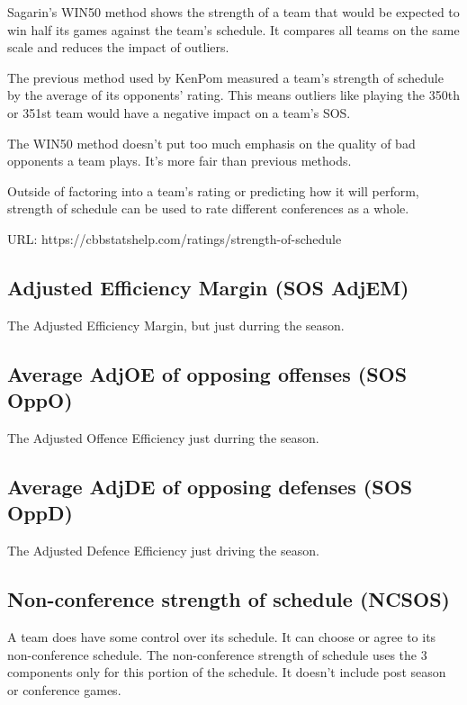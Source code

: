 \documentclass[
10pt, %
a4paper, %
oneside, %
headinclude,footinclude, %
BCOR5mm, %
]{scrartcl}
\begin{document}
\begin{description}
\begin{description}
Sagarin's WIN50 method shows the strength of a team that would be expected to win half its games against the team's schedule. It compares all teams on the same scale and reduces the impact of outliers.

The previous method used by KenPom measured a team's strength of schedule by the average of its opponents' rating. This means outliers like playing the 350th or 351st team would have a negative impact on a team's SOS.

The WIN50 method doesn't put too much emphasis on the quality of bad opponents a team plays. It's more fair than previous methods.

Outside of factoring into a team's rating or predicting how it will perform, strength of schedule can be used to rate different conferences as a whole.

URL: https://cbbstatshelp.com/ratings/strength-of-schedule
	\subsection{Adjusted Efficiency Margin (SOS AdjEM)}
	\begin{description}
		The Adjusted Efficiency Margin, but just durring the season.
	\end{description}
	
	\subsection{Average AdjOE of opposing offenses (SOS OppO)}
	\begin{description}
		The Adjusted Offence Efficiency just durring the season.
	\end{description}
	
	\subsection{Average AdjDE of opposing defenses (SOS OppD)}
	\begin{description}
		The Adjusted Defence Efficiency just driving the season.
	\end{description}

\end{description}


\subsection{Non-conference strength of schedule (NCSOS)}
\begin{description}
A team does have some control over its schedule. It can choose or agree to its non-conference schedule.
The non-conference strength of schedule uses the 3 components only for this portion of the schedule. It doesn't include post season or conference games.


\end{description}
\end{description}
\end{document}
